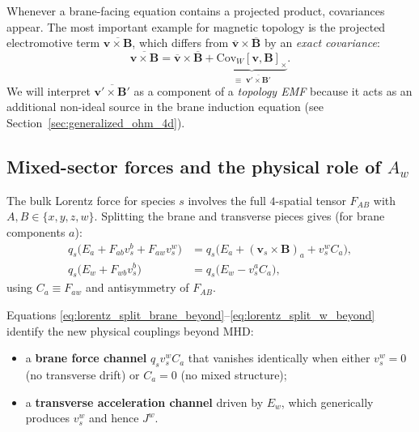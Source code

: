 \documentclass[11pt]{article}
\begin{document}
Whenever a brane-facing equation contains a projected product, covariances appear.
The most important example for magnetic topology is the projected electromotive term
\(\overline{\mathbf{v}\times\mathbf{B}}\), which differs from
\(\overline{\mathbf{v}}\times\overline{\mathbf{B}}\) by an \emph{exact covariance}:
\begin{equation}
\overline{\mathbf{v}\times\mathbf{B}}
=
\overline{\mathbf{v}}\times\overline{\mathbf{B}}
+
\underbrace{\mathrm{Cov}_W[\mathbf{v},\mathbf{B}]_{\times}}_{\equiv\;\overline{\mathbf{v}'\times\mathbf{B}'}}.
\label{eq:EMF_cov_identity_beyond}
\end{equation}
We will interpret \(\overline{\mathbf{v}'\times\mathbf{B}'}\) as a component of a
\emph{topology EMF} because it acts as an additional non-ideal source in the brane induction
equation (see Section~\ref{sec:generalized_ohm_4d}).

\subsection{Mixed-sector forces and the physical role of \texorpdfstring{\(A_w\)}{Aw}}
\label{sec:mixed_sector_forces}

The bulk Lorentz force for species \(s\) involves the full \(4\)-spatial tensor
\(F_{AB}\) with \(A,B\in\{x,y,z,w\}\). Splitting the brane and transverse pieces gives
(for brane components \(a\)):
\begin{align}
q_s\Big(E_a + F_{ab}v_s^b + F_{aw}v_s^w\Big)
&=
q_s\Big(E_a + (\mathbf{v}_s\times\mathbf{B})_a + v_s^w C_a\Big),
\label{eq:lorentz_split_brane_beyond}
\\
q_s\Big(E_w + F_{wb}v_s^b\Big)
&=
q_s\Big(E_w - v_s^a C_a\Big),
\label{eq:lorentz_split_w_beyond}
\end{align}
using \(C_a\equiv F_{aw}\) and antisymmetry of \(F_{AB}\).

Equations \eqref{eq:lorentz_split_brane_beyond}--\eqref{eq:lorentz_split_w_beyond} identify
the new physical couplings beyond MHD:
\begin{itemize}[leftmargin=1.7em]
\item a \textbf{brane force channel} \(q_s v_s^w C_a\) that vanishes identically when either
\(v_s^w=0\) (no transverse drift) or \(C_a=0\) (no mixed structure);
\item a \textbf{transverse acceleration channel} driven by \(E_w\), which generically produces
\(v_s^w\) and hence \(J^w\).
\end{itemize}
\end{document}
